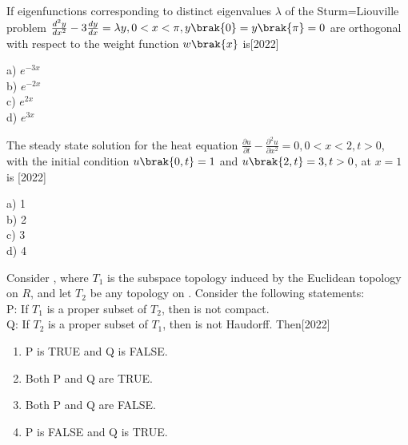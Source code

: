 \item If eigenfunctions corresponding to distinct eigenvalues $\lambda$ of the Sturm=Liouville problem $\frac{d^2y}{dx^2}-3\frac{dy}{dx}=\lambda y, 0<x<\pi,\\ y\brak{0}=y\brak{\pi}=0$ are orthogonal with respect to the weight function $w\brak{x}$ is\hfill{[2022]}
\begin{multicols}{4}
    a) $e^{-3x}$\\
    b) $e^{-2x}$\\
    c) $e^{2x}$\\
    d) $e^{3x}$
\end{multicols}
\item The steady state solution for the heat equation $\frac{\partial u}{\partial t}-\frac{\partial^2 u}{\partial x^2}=0,0<x<2,t>0$, with the initial condition $u\brak{0,t}=1$ and $u\brak{2,t}=3,t>0$, at $x=1$ is \hfill{[2022]}
\begin{multicols}{4}
    a) 1\\
    b) 2\\
    c) 3\\
    d) 4
\end{multicols}

\item Consider , where $T_1$ is the subspace topology induced by the Euclidean topology on $R$, and let $T_2$ be any topology on . Consider the following statements:\\
P: If $T_1$ is a proper subset of $T_2$, then  is not compact.\\
Q: If $T_2$ is a proper subset of $T_1$, then  is not Haudorff. Then\hfill{[2022]}
\begin{enumerate}
    \item P is TRUE and Q is FALSE.
    \item Both P and Q are TRUE.
    \item Both P and Q are FALSE.
    \item P is FALSE and Q is TRUE.
\end{enumerate}

